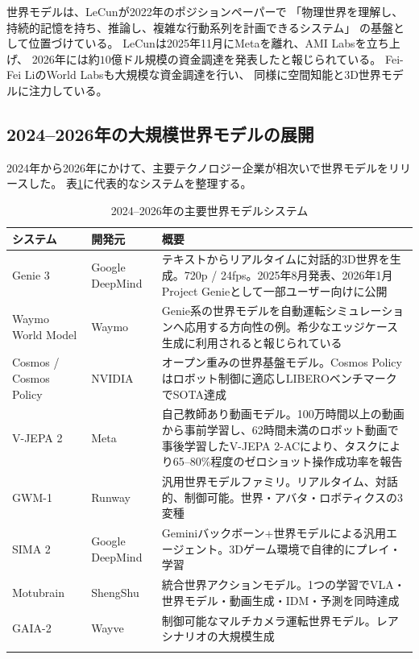 \documentclass[11pt,a4paper]{ltjsarticle}
\begin{document}
世界モデルは、LeCunが2022年のポジションペーパーで
「物理世界を理解し、持続的記憶を持ち、推論し、複雑な行動系列を計画できるシステム」
の基盤として位置づけている\cite{lecun2022ami}。
LeCunは2025年11月にMetaを離れ、AMI Labsを立ち上げ、
2026年には約$10$億ドル規模の資金調達を発表したと報じられている\cite{notboring2026worldmodels}。
Fei-Fei LiのWorld Labsも大規模な資金調達を行い、
同様に空間知能と3D世界モデルに注力している。

\subsection{2024--2026年の大規模世界モデルの展開}

2024年から2026年にかけて、主要テクノロジー企業が相次いで世界モデルをリリースした。
表\ref{tab:world_model_systems}に代表的なシステムを整理する。

{\small
\setlength{\tabcolsep}{3pt}
\begin{longtable}{p{24mm}p{22mm}p{102mm}}
\toprule
システム & 開発元 & 概要 \\
\midrule
\endhead
Genie 3 & Google DeepMind & テキストからリアルタイムに対話的3D世界を生成。720p / 24fps。2025年8月発表、2026年1月Project Genieとして一部ユーザー向けに公開\cite{deepmind2025genie3,google2026projectgenie} \\
\midrule
Waymo World Model & Waymo & Genie系の世界モデルを自動運転シミュレーションへ応用する方向性の例。希少なエッジケース生成に利用されると報じられている\cite{nature2026worldmodels} \\
\midrule
Cosmos / Cosmos Policy & NVIDIA & オープン重みの世界基盤モデル。Cosmos Policyはロボット制御に適応しLIBEROベンチマークでSOTA達成\cite{nvidiacosmospolicy} \\
\midrule
V-JEPA 2 & Meta & 自己教師あり動画モデル。100万時間以上の動画から事前学習し、62時間未満のロボット動画で事後学習したV-JEPA 2-ACにより、タスクにより65--80\%程度のゼロショット操作成功率を報告\cite{vjepa2} \\
\midrule
GWM-1 & Runway & 汎用世界モデルファミリ。リアルタイム、対話的、制御可能。世界・アバタ・ロボティクスの3変種\cite{gwm1} \\
\midrule
SIMA 2 & Google DeepMind & Geminiバックボーン+世界モデルによる汎用エージェント。3Dゲーム環境で自律的にプレイ・学習\cite{notboring2026worldmodels} \\
\midrule
Motubrain & ShengShu & 統合世界アクションモデル。1つの学習でVLA・世界モデル・動画生成・IDM・予測を同時達成\cite{motubrain} \\
\midrule
GAIA-2 & Wayve & 制御可能なマルチカメラ運転世界モデル。レアシナリオの大規模生成\cite{graison2026worldmodels} \\
\bottomrule
\caption{2024--2026年の主要世界モデルシステム}
\label{tab:world_model_systems}
\end{longtable}
}
\end{document}
